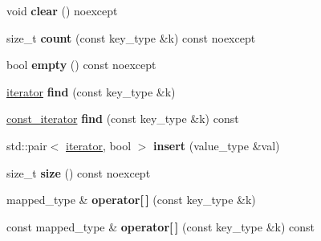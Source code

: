 \begin{DoxyCompactItemize}
\item 
\hypertarget{classtheoria_1_1util_1_1densemap_ae087d2be9f5947d79522f6a3b592786e}{void {\bfseries clear} () noexcept}\label{classtheoria_1_1util_1_1densemap_ae087d2be9f5947d79522f6a3b592786e}

\item 
\hypertarget{classtheoria_1_1util_1_1densemap_ad06bf0be6b547e08f57588c78cc8b3f6}{size\+\_\+t {\bfseries count} (const key\+\_\+type \&k) const noexcept}\label{classtheoria_1_1util_1_1densemap_ad06bf0be6b547e08f57588c78cc8b3f6}

\item 
\hypertarget{classtheoria_1_1util_1_1densemap_aff92774c3fb8a22bef1178348845304f}{bool {\bfseries empty} () const noexcept}\label{classtheoria_1_1util_1_1densemap_aff92774c3fb8a22bef1178348845304f}

\item 
\hypertarget{classtheoria_1_1util_1_1densemap_acf76f330db3de660d40b624c18f92f4c}{\hyperlink{classtheoria_1_1util_1_1densemap_1_1Iter}{iterator} {\bfseries find} (const key\+\_\+type \&k)}\label{classtheoria_1_1util_1_1densemap_acf76f330db3de660d40b624c18f92f4c}

\item 
\hypertarget{classtheoria_1_1util_1_1densemap_aaa6c471543fe77af8eea0a06476bc7b5}{\hyperlink{classtheoria_1_1util_1_1densemap_1_1ConstIter}{const\+\_\+iterator} {\bfseries find} (const key\+\_\+type \&k) const }\label{classtheoria_1_1util_1_1densemap_aaa6c471543fe77af8eea0a06476bc7b5}

\item 
\hypertarget{classtheoria_1_1util_1_1densemap_a10d1d4e2e83bab6062f12b63ed78146d}{std\+::pair$<$ \hyperlink{classtheoria_1_1util_1_1densemap_1_1Iter}{iterator}, bool $>$ {\bfseries insert} (value\+\_\+type \&val)}\label{classtheoria_1_1util_1_1densemap_a10d1d4e2e83bab6062f12b63ed78146d}

\item 
\hypertarget{classtheoria_1_1util_1_1densemap_a3d482d15fc6ea59df3b04d5672aa22de}{size\+\_\+t {\bfseries size} () const noexcept}\label{classtheoria_1_1util_1_1densemap_a3d482d15fc6ea59df3b04d5672aa22de}

\item 
\hypertarget{classtheoria_1_1util_1_1densemap_a98cd543bdf981a2a199f6aaf7e0db02d}{mapped\+\_\+type \& {\bfseries operator\mbox{[}$\,$\mbox{]}} (const key\+\_\+type \&k)}\label{classtheoria_1_1util_1_1densemap_a98cd543bdf981a2a199f6aaf7e0db02d}

\item 
\hypertarget{classtheoria_1_1util_1_1densemap_abf66875d894d9a0a8b40c9d4ab9aed76}{const mapped\+\_\+type \& {\bfseries operator\mbox{[}$\,$\mbox{]}} (const key\+\_\+type \&k) const }\label{classtheoria_1_1util_1_1densemap_abf66875d894d9a0a8b40c9d4ab9aed76}


\end{DoxyCompactItemize}
